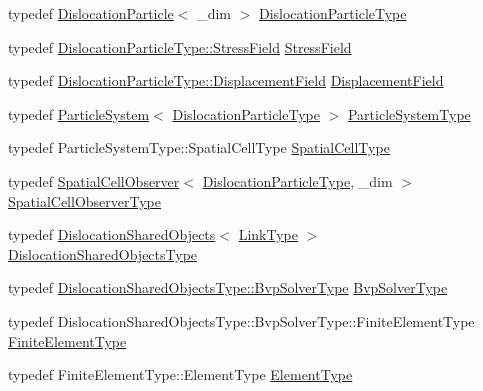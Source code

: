 \begin{DoxyCompactItemize}
\item 
typedef \hyperlink{structmodel_1_1_dislocation_particle}{Dislocation\+Particle}$<$ \+\_\+dim $>$ \hyperlink{classmodel_1_1_dislocation_network_a9ce7afe017f7dd82bb8e5a992fddc7fd}{Dislocation\+Particle\+Type}
\item 
typedef \hyperlink{structmodel_1_1_dislocation_particle_a11c4d91265aef10567dc83b869e06fd5}{Dislocation\+Particle\+Type\+::\+Stress\+Field} \hyperlink{classmodel_1_1_dislocation_network_af03cc04b6ca3727e7802f8f6a984f8e9}{Stress\+Field}
\item 
typedef \hyperlink{structmodel_1_1_dislocation_particle_a3c35f30e393557a4bcb372f270403c31}{Dislocation\+Particle\+Type\+::\+Displacement\+Field} \hyperlink{classmodel_1_1_dislocation_network_aebd83877fb6e1d64a23878d7ec862a59}{Displacement\+Field}
\item 
typedef \hyperlink{structmodel_1_1_particle_system}{Particle\+System}$<$ \hyperlink{classmodel_1_1_dislocation_network_a9ce7afe017f7dd82bb8e5a992fddc7fd}{Dislocation\+Particle\+Type} $>$ \hyperlink{classmodel_1_1_dislocation_network_aab58d4d3eea7aaa963a2ae6b081a5ecf}{Particle\+System\+Type}
\item 
typedef Particle\+System\+Type\+::\+Spatial\+Cell\+Type \hyperlink{classmodel_1_1_dislocation_network_ad1ac55fc699ea84f379ab8ea84b83f46}{Spatial\+Cell\+Type}
\item 
typedef \hyperlink{structmodel_1_1_spatial_cell_observer}{Spatial\+Cell\+Observer}$<$ \hyperlink{classmodel_1_1_dislocation_network_a9ce7afe017f7dd82bb8e5a992fddc7fd}{Dislocation\+Particle\+Type}, \+\_\+dim $>$ \hyperlink{classmodel_1_1_dislocation_network_a9a91f24bae6ebbc5bb87361e1d8d1155}{Spatial\+Cell\+Observer\+Type}
\item 
typedef \hyperlink{structmodel_1_1_dislocation_shared_objects}{Dislocation\+Shared\+Objects}$<$ \hyperlink{_spline_node_base__corder0_8h_ab09ccc0af6ea9402dfef7b0eac55cff3}{Link\+Type} $>$ \hyperlink{classmodel_1_1_dislocation_network_a5f6775646c83fb5964cd18bf6d5f3200}{Dislocation\+Shared\+Objects\+Type}
\item 
typedef \hyperlink{structmodel_1_1_dislocation_shared_objects_a7562afb5a99947edfee0669cfe78f8b6}{Dislocation\+Shared\+Objects\+Type\+::\+Bvp\+Solver\+Type} \hyperlink{classmodel_1_1_dislocation_network_acecaeb744bb1ab8bdefdcd85d330ae86}{Bvp\+Solver\+Type}
\item 
typedef Dislocation\+Shared\+Objects\+Type\+::\+Bvp\+Solver\+Type\+::\+Finite\+Element\+Type \hyperlink{classmodel_1_1_dislocation_network_a922220494d5bbb33852534a304b477f1}{Finite\+Element\+Type}
\item 
typedef Finite\+Element\+Type\+::\+Element\+Type \hyperlink{classmodel_1_1_dislocation_network_a94c2f9be4e96e8c14abab8f94cd8c1b1}{Element\+Type}
\end{DoxyCompactItemize}
